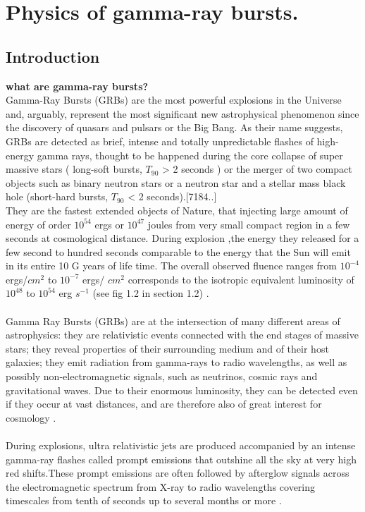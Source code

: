 \setcounter{chapter}{0}
\chapter{Physics of gamma-ray bursts.}
\section{Introduction}
 
\textbf{what are gamma-ray bursts?}\\
Gamma-Ray Bursts (GRBs) are the most powerful explosions in the Universe and, arguably, represent the most significant new astrophysical phenomenon since the discovery of quasars and pulsars or the Big Bang. As their name suggests, GRBs are detected as brief, intense and totally unpredictable flashes of high-energy gamma rays, thought to be happened during the core collapse of super massive stars ( long-soft bursts, $T _{90}$ > 2 seconds ) or the merger of two compact objects such as binary neutron stars or a neutron star and a stellar mass black hole (short-hard bursts, $T _{90}$ < 2 seconds).[7184..]\\ 
They are the fastest extended objects of Nature, that injecting large amount of energy of order $10^{54}$ ergs or $ 10^{47} $ joules from very small compact region in a few seconds at cosmological distance. During explosion ,the energy they released for a few second to hundred seconds comparable to the energy that  the Sun will emit in its entire 10 G years of life time. The overall observed fluence ranges from $10^{-4} $ ergs/$ cm^{2}$ to $ 10^{-7} $ ergs/ $ cm^{2} $  corresponds to the isotropic equivalent luminosity of $ 10^{48} $  to  $10^{54} $ erg $ s^{-1} $ (see fig 1.2 in  section 1.2) \citep{1}.\\\\
Gamma Ray Bursts (GRBs) are at the intersection of many different areas of astrophysics: they are relativistic events connected with the end stages of massive stars; they reveal properties of their surrounding medium and of their host galaxies; they emit radiation from gamma-rays to radio wavelengths, as well as possibly non-electromagnetic signals, such as neutrinos, cosmic rays and gravitational waves. Due to their enormous luminosity, they can be detected even if they occur at vast distances, and are therefore also of great interest for cosmology \citep{2}.\\\\
 During  explosions, ultra relativistic jets are produced accompanied by an intense gamma-ray flashes called prompt emissions that outshine all the sky at very high red shifts.These prompt emissions are often followed by afterglow signals across the electromagnetic spectrum from X-ray to radio wavelengths covering timescales from tenth of seconds up to several months or more \citep{1,2}.\\\\
